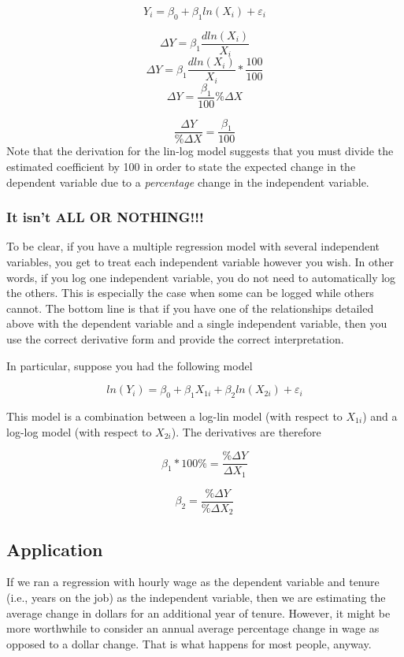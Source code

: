 \documentclass[
]{book}
\begin{document}
\[Y_i=\beta_0 + \beta_1 ln(X_i) + \varepsilon_i\]

\[\Delta Y=\beta_1 \frac{dln(X_i)}{X_i}\]
\[\Delta Y=\beta_1 \frac{dln(X_i)}{X_i}*\frac{100}{100}\]
\[\Delta Y=\frac{\beta_1}{100} \%\Delta X\]

\[\frac{\Delta Y}{\%\Delta X}=\frac{\beta_1}{100} \]
Note that the derivation for the lin-log model suggests that you must divide the estimated coefficient by 100 in order to state the expected change in the dependent variable due to a \emph{percentage} change in the independent variable.

\subsubsection*{It isn't ALL OR NOTHING!!!}\label{it-isnt-all-or-nothing}

To be clear, if you have a multiple regression model with several independent variables, you get to treat each independent variable however you wish. In other words, if you log one independent variable, you do not need to automatically log the others. This is especially the case when some can be logged while others cannot. The bottom line is that if you have one of the relationships detailed above with the dependent variable and a single independent variable, then you use the correct derivative form and provide the correct interpretation.

In particular, suppose you had the following model

\[ln(Y_i)=\beta_0 + \beta_1 X_{1i} + \beta_2 ln(X_{2i}) + \varepsilon_i\]

This model is a combination between a log-lin model (with respect to \(X_{1i}\)) and a log-log model (with respect to \(X_{2i}\)). The derivatives are therefore

\[\beta_1 * 100\% = \frac{\% \Delta Y}{\Delta X_1}\]

\[\beta_2= \frac{\% \Delta Y}{\%\Delta X_2}\]

\subsection*{Application}\label{application}

If we ran a regression with hourly wage as the dependent variable and tenure (i.e., years on the job) as the independent variable, then we are estimating the average change in dollars for an additional year of tenure. However, it might be more worthwhile to consider an annual average percentage change in wage as opposed to a dollar change. That is what happens for most people, anyway.
\end{document}
